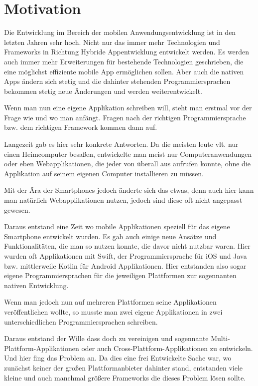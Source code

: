 \chapter{Motivation}




Die Entwicklung im Bereich der mobilen Anwendungsentwicklung ist in den letzten Jahren sehr hoch. Nicht nur das immer mehr Technologien und Frameworks in Richtung Hybride Appentwicklung entwickelt werden. Es werden auch immer mehr Erweiterungen für bestehende Technologien geschrieben, die eine möglichst effiziente mobile App ermöglichen sollen. Aber auch die nativen Apps ändern sich stetig und die dahinter stehenden Programmiersprachen bekommen stetig neue Änderungen und werden weiterentwickelt.

Wenn man nun eine eigene Applikation schreiben will, steht man erstmal vor der Frage wie und wo man anfängt.
Fragen nach der richtigen Programmiersprache bzw. dem richtigen Framework kommen dann auf.

Langezeit gab es hier sehr konkrete Antworten. Da die meisten leute vlt. nur einen Heimcomputer besaßen, entwickelte man meist nur Computeranwendungen oder eben Webapplikationen, die jeder von überall aus aufrufen konnte, ohne die Applikation auf seinem eigenen Computer installieren zu müssen.

Mit der Ära der Smartphones jedoch änderte sich das etwas, denn auch hier kann man natürlich Webapplikationen nutzen, jedoch sind diese oft nicht angepasst gewesen.

Daraus entstand eine Zeit wo mobile Applikationen speziell für das eigene Smartphone entwickelt wurden. Es gab auch einige neue Ansätze und Funktionalitäten, die man so nutzen konnte, die davor nicht nutzbar waren. Hier wurden oft Applikationen mit Swift, der Programmiersprache für iOS und Java bzw. mittlerweile Kotlin für Android Applikationen. Hier entstanden also sogar eigene Programmiersprachen für die jeweiligen Plattformen zur sogennanten nativen Entwicklung.

Wenn man jedoch nun auf mehreren Plattformen seine Applikationen veröffentlichen wollte, so musste man zwei eigene Applikationen in zwei unterschiedlichen Programmiersprachen schreiben. 

Daraus entstand der Wille dass doch zu vereinigen und sogennante Multi-Plattform-Applikationen oder auch Cross-Plattform-Applikationen zu entwickeln.
Und hier fing das Problem an. Da dies eine frei Entwickelte Sache war, wo zunächst keiner der großen Plattformanbieter dahinter stand, entstanden viele kleine und auch manchmal größere Frameworks die dieses Problem lösen sollte.

